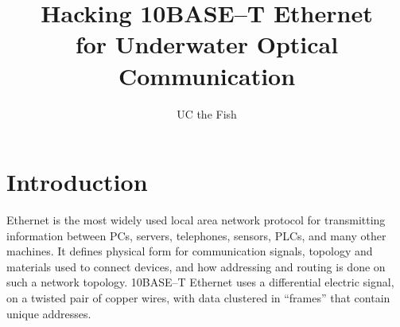 \documentclass{article}
\begin{document}
\title{Hacking 10BASE--T Ethernet\\for Underwater Optical Communication}
\author{UC the Fish}

\maketitle

\section{Introduction}

Ethernet is the most widely used local area network protocol for transmitting
information between PCs, servers, telephones, sensors, PLCs, and many other machines.
It defines physical form for communication signals,
topology and materials used to connect devices,
and how addressing and routing is done on such a network topology.
10BASE--T Ethernet uses a differential electric signal, on a twisted pair
of copper wires, with data clustered in ``frames'' that contain unique
addresses.
\end{document}
